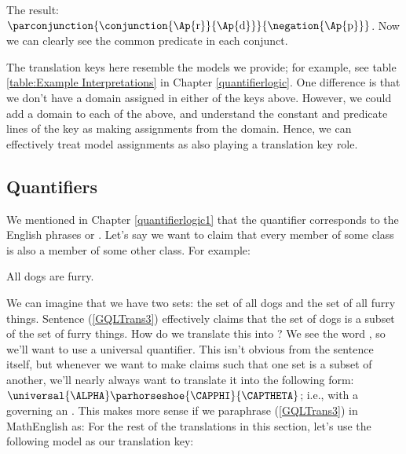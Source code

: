 \noindent{}The result: $\parconjunction{\conjunction{\Ap{\constant{r}}}{\Ap{\constant{d}}}}{\negation{\Ap{\constant{p}}}}$.  Now we can clearly see the common predicate in each conjunct.

The translation keys here resemble the \GQL{} models we provide; for example, see table \ref{table:Example Interpretations} in Chapter \ref{quantifierlogic}.  One difference is that we don't have a domain assigned in either of the \GQL{} keys above.  However, we could add a domain to each of the above, and understand the constant and predicate lines of the key as making assignments from the domain.  Hence, we can effectively treat model assignments as also playing a translation key role.

\subsection{Quantifiers}

We mentioned in Chapter \ref{quantifierlogic1} that the quantifier \mention{$\forall$} corresponds to the English phrases  or .  Let's say we want to claim that every member of some class is also a member of some other class.  For example:

\begin{menumerate}
	\item\label{GQLTrans3} All dogs are furry.
\end{menumerate}

\noindent{}We can imagine that we have two sets: the set of all dogs and the set of all furry things.  Sentence (\ref{GQLTrans3}) effectively claims that the set of dogs is a subset of the set of furry things.  How do we translate this into \GQL{}?  We see the word , so we'll want to use a universal quantifier.  This isn't obvious from the sentence itself, but whenever we want to make claims such that one set is a subset of another, we'll nearly always want to translate it into the following form: $\universal{\ALPHA}\parhorseshoe{\CAPPHI}{\CAPTHETA}$; i.e., with a \mention{$\forall$} governing an \mention{$\HORSESHOE$}.  This makes more sense if we paraphrase (\ref{GQLTrans3}) in MathEnglish as:   For the rest of the translations in this section, let's use the following model as our translation key:


